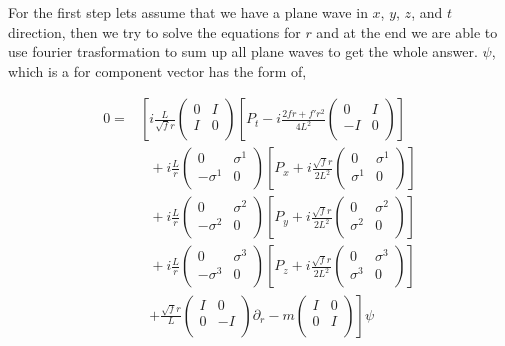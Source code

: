 For the first step lets assume that we have a plane wave in $x$, $y$, $z$, and $t$ direction, then we try to solve the equations for $r$ and at the end we are able to use fourier trasformation to sum up all plane waves to get the whole answer. $\psi$, which is a for component vector has the form of,

\begin{align}
   0 =& \left[ i\frac{L}{\sqrt{f}r} \begin{pmatrix} 0 & I \\ I & 0 \\ \end{pmatrix} \left[ P_t - i\frac{2fr+f'r^2}{4L^2}\begin{pmatrix} 0 & I \\ -I & 0 \\ \end{pmatrix} \right] \right.\nonumber\\
      & ~~~ + i\frac{L}{r}\begin{pmatrix} 0 & \sigma^1 \\ -\sigma^1 & 0 \\ \end{pmatrix} \left[ P_x + i\frac{\sqrt{f}r}{2L^2}\begin{pmatrix} 0 & \sigma^1 \\ \sigma^1 & 0 \\ \end{pmatrix} \right] \nonumber\\
      & ~~~ + i\frac{L}{r}\begin{pmatrix} 0 & \sigma^2 \\ -\sigma^2 & 0 \\ \end{pmatrix} \left[ P_y + i\frac{\sqrt{f}r}{2L^2}\begin{pmatrix} 0 & \sigma^2 \\ \sigma^2 & 0 \\ \end{pmatrix} \right] \nonumber\\
      & ~~~ + i\frac{L}{r}\begin{pmatrix} 0 & \sigma^3 \\ -\sigma^3 & 0 \\ \end{pmatrix} \left[ P_z + i\frac{\sqrt{f}r}{2L^2}\begin{pmatrix} 0 & \sigma^3 \\ \sigma^3 & 0 \\ \end{pmatrix} \right] \nonumber\\
      & ~~~ \left. + \frac{\sqrt{f}r}{L}\begin{pmatrix} I & 0 \\ 0 & -I \\ \end{pmatrix} \partial_r - m \begin{pmatrix} I & 0 \\ 0 & I \\ \end{pmatrix} \right] \psi
\end{align}


